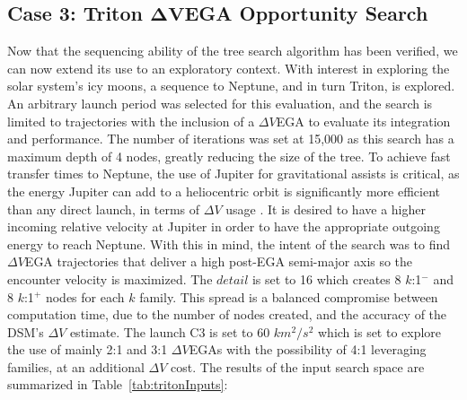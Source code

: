 \documentclass[letterpaper, preprint, paper,11pt]{AAS}	%
\begin{document}
\subsection*{Case 3: Triton $\boldsymbol{\Delta V}$EGA Opportunity Search}

Now that the sequencing ability of the tree search algorithm has been verified, we can now extend its use to an exploratory context. With interest in exploring the solar system's icy moons, a sequence to Neptune, and in turn Triton, is explored\cite{Hubbard2010}. An arbitrary launch period was selected for this evaluation, and the search is limited to trajectories with the inclusion of a $\Delta V$EGA to evaluate its integration and performance. The number of iterations was set at 15,000 as this search has a maximum depth of 4 nodes, greatly reducing the size of the tree. To achieve fast transfer times to Neptune, the use of Jupiter for gravitational assists is critical, as the energy Jupiter can add to a heliocentric orbit is significantly more efficient than any direct launch, in terms of $\Delta V$ usage \cite{Landau2010}. It is desired to have a higher incoming relative velocity at Jupiter in order to have the appropriate outgoing energy to reach Neptune. With this in mind, the intent of the search was to find $\Delta V$EGA trajectories that deliver a high post-EGA semi-major axis so the encounter velocity is maximized. The $\textit{detail}$ is set to 16 which creates 8 $k$:1$^{-}$ and 8 $k$:1$^{+}$ nodes for each $k$ family. This spread is a balanced compromise between computation time, due to the number of nodes created, and the accuracy of the DSM's $\Delta V$ estimate. The launch C3 is set to 60 $km^2/s^2$ which is set to explore the use of mainly 2:1 and 3:1 $\Delta V$EGAs with the possibility of 4:1 leveraging families, at an additional $\Delta V$ cost. The results of the input search space are summarized in Table~\ref{tab:tritonInputs}:
\end{document}
